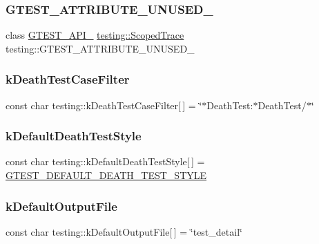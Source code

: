 \subsubsection{\texorpdfstring{GTEST\_ATTRIBUTE\_UNUSED\_}{GTEST\_ATTRIBUTE\_UNUSED\_}}
{\footnotesize\ttfamily class \mbox{\hyperlink{gtest-port_8h_aa73be6f0ba4a7456180a94904ce17790}{G\+T\+E\+S\+T\+\_\+\+A\+P\+I\+\_\+}} \mbox{\hyperlink{classtesting_1_1ScopedTrace}{testing\+::\+Scoped\+Trace}}  testing\+::\+G\+T\+E\+S\+T\+\_\+\+A\+T\+T\+R\+I\+B\+U\+T\+E\+\_\+\+U\+N\+U\+S\+E\+D\+\_\+}

\mbox{\label{namespacetesting_a23c33f4bfcc3c2e5e620eff31a98892d}} 
\subsubsection{\texorpdfstring{kDeathTestCaseFilter}{kDeathTestCaseFilter}}
{\footnotesize\ttfamily const char testing\+::k\+Death\+Test\+Case\+Filter\mbox{[}$\,$\mbox{]} = \char`\"{}$\ast$Death\+Test\+:$\ast$Death\+Test/$\ast$\char`\"{}\hspace{0.3cm}{\ttfamily [static]}}

\mbox{\label{namespacetesting_a317291240e750e2142a23cbd52bc5aec}} 
\subsubsection{\texorpdfstring{kDefaultDeathTestStyle}{kDefaultDeathTestStyle}}
{\footnotesize\ttfamily const char testing\+::k\+Default\+Death\+Test\+Style\mbox{[}$\,$\mbox{]} = \mbox{\hyperlink{gtest-port_8h_a491d09ee62f1c9cfeafa3dbf75aaa9e2}{G\+T\+E\+S\+T\+\_\+\+D\+E\+F\+A\+U\+L\+T\+\_\+\+D\+E\+A\+T\+H\+\_\+\+T\+E\+S\+T\+\_\+\+S\+T\+Y\+LE}}\hspace{0.3cm}{\ttfamily [static]}}

\mbox{\label{namespacetesting_aa5a002b5bb3784c830b1c99aa2688f27}} 
\subsubsection{\texorpdfstring{kDefaultOutputFile}{kDefaultOutputFile}}
{\footnotesize\ttfamily const char testing\+::k\+Default\+Output\+File\mbox{[}$\,$\mbox{]} = \char`\"{}test\+\_\+detail\char`\"{}\hspace{0.3cm}{\ttfamily [static]}}

